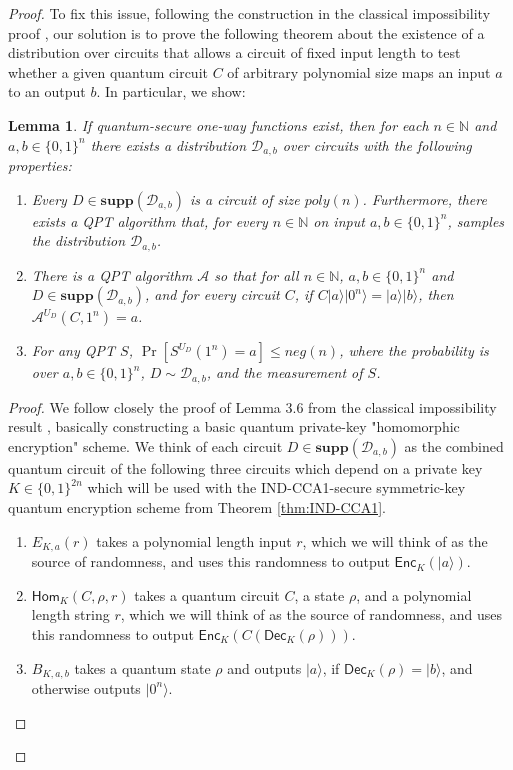 \documentclass[11pt]{article}
\numberwithin{equation}{section}
\newtheorem{lemma}[theorem]{Lemma}
\newcommand{\algo}{\mathcal}
\newcommand{\Enc}{\ensuremath{\mathsf{Enc}}\xspace}
\newcommand{\Dec}{\ensuremath{\mathsf{Dec}}\xspace}
\newcommand{\Homorcl}{\ensuremath{\mathsf{Hom}}\xspace}
\newcommand\supp{\textbf{supp}}
\begin{document}
{\begin{proof}
To fix this issue, following the construction in the classical impossibility proof \cite{BGIRSVY12}, our solution is to prove the following theorem about the existence of a distribution over circuits that allows a circuit of fixed input length to test whether a given quantum circuit $C$ of arbitrary polynomial size maps an input $a$ to an output $b$. In particular, we show:
\begin{lemma}\label{lemma-circuitdistribution}
	If quantum-secure one-way functions exist, then for each $n\in\mathbb{N}$ and $a,b\in\{0,1\}^n$ there exists a distribution $\mathcal{D}_{a,b}$ over circuits with the following properties:
\begin{enumerate}
\item{Every $D\in \supp(\mathcal{D}_{a,b})$ is a circuit of size $poly(n)$.  Furthermore, there exists a QPT algorithm that,  for every $n\in\mathbb{N}$ on input $a,b\in\{0,1\}^n$, samples the distribution $\mathcal{D}_{a,b}$.}
\item{There is a QPT algorithm $\algo{A}$ so that for all $n \in \mathbb{N}$,   $a,b\in\{0,1\}^n$ and $D\in \supp(\mathcal{D}_{a,b})$, and for every circuit $C$, if $C|a\rangle|0^n\rangle=|a\rangle|b\rangle$, then $\algo{A}^{U_D}(C,1^n)=a$.}
\item{For any QPT $S$, $\Pr[S^{U_D}(1^n)=a]\leq neg(n)$, where the probability is over $a,b\in\{0,1\}^n$, $D\sim \mathcal{D}_{a,b}$, and the measurement of $S$.}	
\end{enumerate}
\end{lemma}

\begin{proof}  We follow closely the proof of Lemma 3.6 from the classical impossibility result \cite{BGIRSVY12}, basically constructing a basic quantum private-key "homomorphic encryption" scheme.  We think of each circuit $D\in \supp(\mathcal{D}_{a,b})$ as the combined quantum circuit of the following three circuits which depend on a private key $K\in\{0,1\}^{2n}$ which will be used with the IND-CCA1-secure symmetric-key quantum encryption scheme from Theorem \ref{thm:IND-CCA1}.
\begin{enumerate}
\item{$E_{K,a}(r)$ takes a polynomial length input $r$, which we will think of as the source of randomness, and uses this randomness to output  $\Enc_{K}(|a\rangle)$}.  
\item{$\Homorcl_K(C,\rho,r)$ takes a quantum circuit $C$, a state $\rho$, and a polynomial length string $r$, which we will think of as the source of randomness, and uses this randomness to output $\Enc_K(C(\Dec_K(\rho)))$}.
\item{$B_{K,a,b}$ takes a quantum state $\rho$ and outputs $|a\rangle$, if $\Dec_{K}(\rho)=|b\rangle$, and otherwise outputs $|0^n\rangle$.}	
\end{enumerate}


\end{proof}
\end{proof}}
\end{document}
